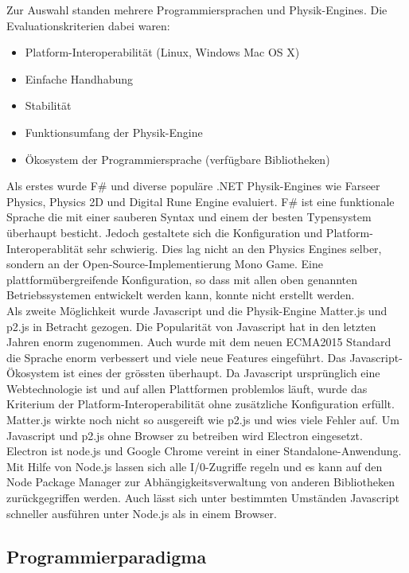     Zur Auswahl standen mehrere Programmiersprachen und Physik-Engines.
    Die Evaluationskriterien dabei waren:
    \begin{itemize}
      \item Platform-Interoperabilität (Linux, Windows Mac OS X)
      \item Einfache Handhabung
      \item Stabilität
      \item Funktionsumfang der Physik-Engine
      \item Ökosystem der Programmiersprache (verfügbare Bibliotheken)
    \end{itemize}

    Als erstes wurde F\# und diverse populäre .NET Physik-Engines wie Farseer Physics,
    Physics 2D und Digital Rune Engine evaluiert.
    F\# ist eine funktionale Sprache die mit einer sauberen Syntax und einem der besten Typensystem überhaupt besticht.
    Jedoch gestaltete sich die Konfiguration und Platform-Interoperablität sehr schwierig.
    Dies lag nicht an den Physics Engines selber, sondern an der Open-Source-Implementierung Mono Game.
    Eine plattformübergreifende Konfiguration,
    so dass mit allen oben genannten Betriebssystemen entwickelt werden kann,
    konnte nicht erstellt werden.
    \\
    Als zweite Möglichkeit wurde Javascript und die Physik-Engine Matter.js und p2.js in Betracht gezogen.
    Die Popularität von Javascript hat in den letzten Jahren enorm zugenommen.
    Auch wurde mit dem neuen ECMA2015 Standard die Sprache enorm verbessert und viele neue Features eingeführt.
    Das Javascript-Ökosystem ist eines der grössten überhaupt.
    Da Javascript ursprünglich eine Webtechnologie ist und auf allen Plattformen problemlos läuft,
    wurde das Kriterium der Platform-Interoperabilität ohne zusätzliche Konfiguration erfüllt.
    Matter.js wirkte noch nicht so ausgereift wie p2.js und wies viele Fehler auf.
    Um Javascript und p2.js ohne Browser zu betreiben wird Electron eingesetzt.
    Electron ist node.js und Google Chrome vereint in einer Standalone-Anwendung.
    Mit Hilfe von Node.js lassen sich alle I/0-Zugriffe regeln und es kann auf den
    Node Package Manager zur Abhängigkeitsverwaltung von anderen Bibliotheken zurückgegriffen werden.
    Auch lässt sich unter bestimmten Umständen Javascript schneller ausführen unter Node.js als in einem Browser.

    \subsection{Programmierparadigma\label{sub:TechnologyParadigma}}

